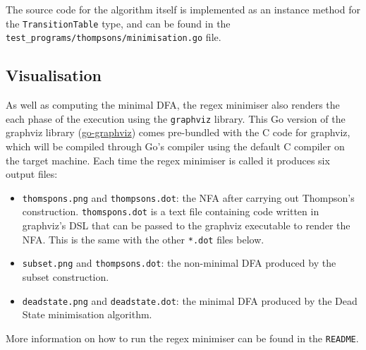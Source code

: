 The source code for the algorithm itself is implemented as an instance method for the \verb|TransitionTable| type, and can be found in the \verb|test_programs/thompsons/minimisation.go| file.

\subsection{Visualisation}

As well as computing the minimal DFA, the regex minimiser also renders the each phase of the execution using the \verb|graphviz| library. This Go version of the graphviz library (\href{https://github.com/goccy/go-graphviz}{go-graphviz}) comes pre-bundled with the C code for graphviz, which will be compiled through Go's compiler using the default C compiler on the target machine. Each time the regex minimiser is called it produces six output files:

\begin{itemize}
    \item \verb|thomspons.png| and \verb|thompsons.dot|: the NFA after carrying out Thompson's construction. \verb|thomspons.dot| is a text file containing code written in graphviz's DSL that can be passed to the graphviz executable to render the NFA. This is the same with the other \verb|*.dot| files below.
    \item \verb|subset.png| and \verb|thompsons.dot|: the non-minimal DFA produced by the subset construction.
    \item \verb|deadstate.png| and \verb|deadstate.dot|: the minimal DFA produced by the Dead State minimisation algorithm.
\end{itemize}

More information on how to run the regex minimiser can be found in the \verb|README|.
